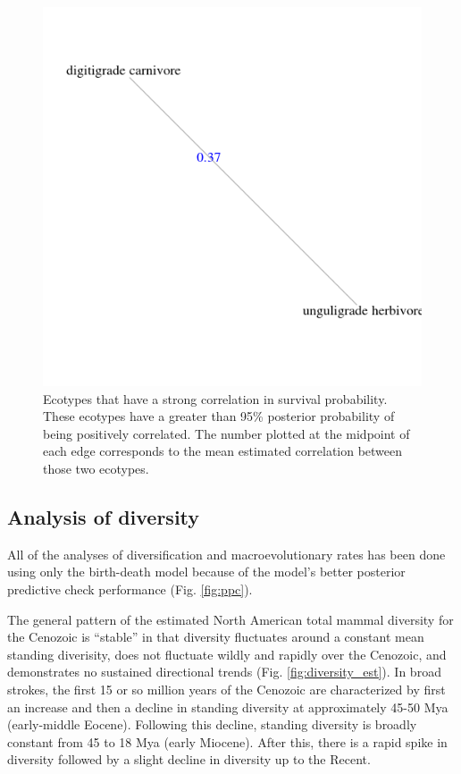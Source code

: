 \begin{figure}[ht]
  \centering
  \includegraphics[width=\textwidth,height=0.4\textheight,keepaspectratio=true]{chapter_coping/figure/surv_sig_corr}
  \caption[Ecotypes with strong correlations in survival probability]{Ecotypes that have a strong correlation in survival probability. These ecotypes have a greater than 95\% posterior probability of being positively correlated. The number plotted at the midpoint of each edge corresponds to the mean estimated correlation between those two ecotypes.}
  \label{fig:surv_corr_graph}
\end{figure}



\subsection*{Analysis of diversity}

All of the analyses of diversification and macroevolutionary rates has been done using only the birth-death model because of the model's better posterior predictive check performance (Fig. \ref{fig:ppc}).


The general pattern of the estimated North American total mammal diversity for the Cenozoic is ``stable'' in that diversity fluctuates around a constant mean standing diverisity, does not fluctuate wildly and rapidly over the Cenozoic, and demonstrates no sustained directional trends (Fig. \ref{fig:diversity_est}). In broad strokes, the first 15 or so million years of the Cenozoic are characterized by first an increase and then a decline in standing diversity at approximately 45-50 Mya (early-middle Eocene). Following this decline, standing diversity is broadly constant from 45 to 18 Mya (early Miocene). After this, there is a rapid spike in diversity followed by a slight decline in diversity up to the Recent. 

